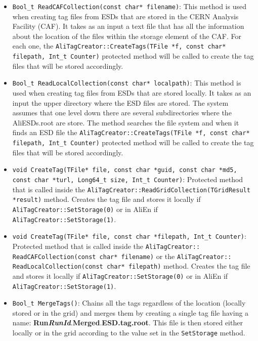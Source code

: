 \documentclass[12pt,a4paper,twoside]{article}
\newcommand{\method}[1]{\texttt{#1}\xspace}
\begin{document}
{\begin{itemize}
\item \method{Bool\_t ReadCAFCollection(const char* filename)}: This
  method is used when creating tag files from ESDs that are stored in
  the CERN Analysis Facility (CAF)\cite{CAF}. It takes as an input a
  text file that has all the information about the location of the
  files within the storage element of the CAF. For each one, the
  \method{AliTagCreator::CreateTags(TFile *f, const char* filepath,
    Int\_t Counter)} protected method will be called to create the tag
  files that will be stored accordingly.

\item \method{Bool\_t ReadLocalCollection(const char* localpath)}:
  This method is used when creating tag files from ESDs that are
  stored locally. It takes as an input the upper directory where the
  ESD files are stored. The system assumes that one level down there
  are several subdirectories where the AliESDs.root are store. The
  method searches the file system and when it finds an ESD file the
  \method{AliTagCreator::CreateTags(TFile *f, const char* filepath, Int\_t Counter)}
 protected method will be called to create the tag
  files that will be stored accordingly.

\item \method{void CreateTag(TFile* file, const char *guid, const char *md5, const char *turl, Long64\_t size, Int\_t Counter)}:
 Protected method that is called inside the
 \method{AliTagCreator::ReadGridCollection(TGridResult *result)}
 method. Creates the tag file and stores it locally if \method{AliTagCreator::SetStorage(0)}
  or in AliEn if \method{AliTagCreator::SetStorage(1)}.

\item \method{void CreateTag(TFile* file, const char *filepath, Int\_t Counter)}:
 Protected method that is called inside the
  \method{AliTagCreator:: ReadCAFCollection(const char* filename)} or
  the \method{AliTagCreator:: ReadLocalCollection(const char* filepath)}
 method. Creates the tag file and stores it locally if
  \method{AliTagCreator::SetStorage(0)} or in AliEn if
  \method{AliTagCreator::SetStorage(1)}.

\item \method{Bool\_t MergeTags()}: Chains all the tags regardless of
  the location (locally stored or in the grid) and merges them by
  creating a single tag file having a name:
  \textbf{Run}\textbf{\textit{RunId}}.\textbf{Merged}.\textbf{ESD.tag.root}.
  This file is then stored either locally or in the grid according to
  the value set in the \method{SetStorage} method.




\end{itemize}}
\end{document}
